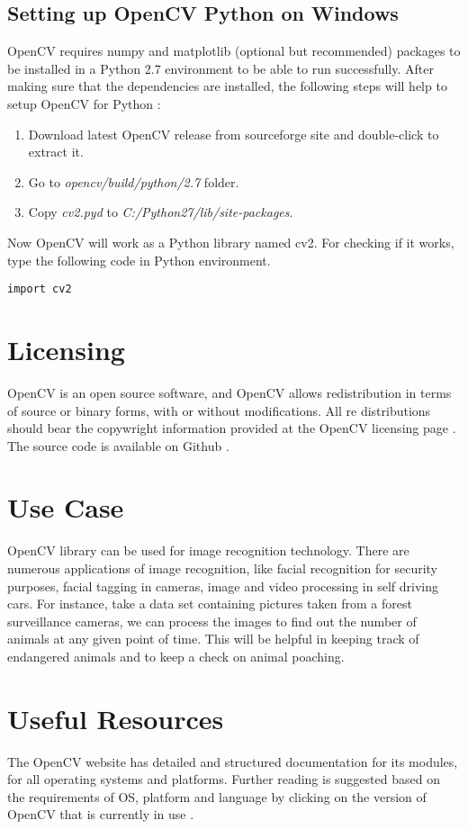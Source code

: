 \documentclass[9pt,twocolumn,twoside]{../../styles/osajnl}
\begin{document}
\subsection{Setting up OpenCV Python on Windows}
OpenCV requires numpy and matplotlib (optional but recommended) packages to be installed in a Python 2.7 environment to be able to run successfully. After making sure that the dependencies are installed, the following steps will help to setup OpenCV for Python \cite{www-opencv-python}:

\begin{enumerate}
    \item Download latest OpenCV release from sourceforge site \cite{www-opencv-sf} and double-click to extract it.
    \item Go to \textit{opencv/build/python/2.7} folder.
    \item Copy \textit{cv2.pyd} to \textit{C:/Python27/lib/site-packages}. 
\end{enumerate}
Now OpenCV will work as a Python library named cv2. For checking if it works, type the following code in Python environment.
\begin{Verbatim}
import cv2
\end{Verbatim}

\section{Licensing}
OpenCV is an open source software, and OpenCV allows redistribution in terms of source or binary forms, with or without modifications. All re distributions should bear the copywright information provided at the OpenCV licensing page \cite{www-opencv-license}. The source code is available on Github \cite{www-git-opencv}.

\section{Use Case}
OpenCV library can be used for image recognition technology. There are numerous applications of image recognition, like facial recognition for security purposes, facial tagging in cameras, image and video processing in self driving cars. For instance, take a data set containing pictures taken from a forest surveillance cameras, we can process the images to find out the number of animals at any given point of time. This will be helpful in keeping track of endangered animals and to keep a check on animal poaching. 

\section{Useful Resources}
The OpenCV website has detailed and structured documentation for its modules, for all operating systems and platforms. Further reading is suggested based on the requirements of OS, platform and language by clicking on the version of OpenCV that is currently in use \cite{www-opencv-docs}. 
\end{document}
